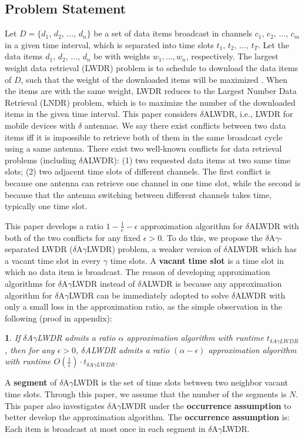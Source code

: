 \documentclass[11pt,english,onecolumn,draftcls]{IEEEtran}
\theoremstyle{plain}
\theoremstyle{plain}
\newtheorem{prop}[thm]{\protect\propositionname}
\theoremstyle{plain}
\theoremstyle{plain}
\providecommand{\propositionname}{Proposition}
\begin{document}
\subsection{Problem Statement}

Let $D=\{d_{1},\, d_{2},\,\dots,\, d_{n}\}$ be a set of data items
broadcast in channels $c_{1},\, c_{2},\,\dots,\, c_{m}$ in a given
time interval, which is separated into time slots $t_{1},\, t_{2},\,\dots,\, t_{T}$.
Let the data items $d_{1},\, d_{2},\,\dots,\, d_{n}$ be with weights
$w_{1},\dots,w_{n}$, respectively. The largest weight data retrieval
(LWDR) problem is to schedule to download the data items of $D$,
such that the weight of the downloaded items will be maximized \cite{Infocom12LuEfficient}.
When the items are with the same weight, LWDR reduces to the Largest
Number Data Retrieval (LNDR) problem, which is to maximize the number
of the downloaded items in the given time interval. This paper considers
$\delta$ALWDR, i.e., LWDR for mobile devices with $\delta$ antennae.
We say there exist conflicts between two data items iff it is impossible
to retrieve both of them in the same broadcast cycle using a same
antenna. There exist two well-known conflicts for data retrieval problems
(including $\delta$ALWDR): (1) two requested data items at two same
time slots; (2) two adjacent time slots of different channels. The
first conflict is because one antenna can retrieve one channel in
one time slot, while the second is because that the antenna switching
between different channels takes time, typically one time slot.

This paper develops a ratio $1-\frac{1}{e}-\epsilon$ approximation
algorithm for $\delta$ALWDR with both of the two conflicts for any
fixed $\epsilon>0$. To do this, we propose the $\delta$A$\gamma$-separated
LWDR ($\delta$A$\gamma$LWDR) problem, a weaker version of $\delta$ALWDR
which has a vacant time slot in every $\gamma$ time slots. A \textbf{vacant}
\textbf{time slot} is a time slot in which no data item is broadcast.
The reason of developing approximation algorithms for $\delta$A$\gamma$LWDR
instead of $\delta$ALWDR is because any approximation algorithm for
$\delta$A$\gamma$LWDR can be immediately adopted to solve $\delta$ALWDR
with only a small loss in the approximation ratio, as the simple observation
in the following (proof in appendix):
\begin{prop}
\label{prop:simpobsbetw-gamma}If $\delta$A$\gamma$LWDR admits a
ratio $\alpha$ approximation algorithm with runtime $t_{\delta A\gamma LWDR}$,
then for any $\epsilon>0$, $\delta$ALWDR admits a ratio $(\alpha-\epsilon)$
approximation algorithm with runtime $O(\frac{1}{\epsilon})\cdot t_{\delta A\gamma LWDR}$.
\end{prop}
A \textbf{segment} of $\delta$A$\gamma$LWDR is the set of time slots
between two neighbor vacant time slots. Through this paper, we assume
that the number of the segments is $N$. This paper also investigates
$\delta$A$\gamma$LWDR under the \textbf{occurrence assumption} to
better develop the approximation algorithm. The \textbf{occurrence
assumption} is: Each item is broadcast at most once in each segment
in $\delta$A$\gamma$LWDR.
\end{document}
